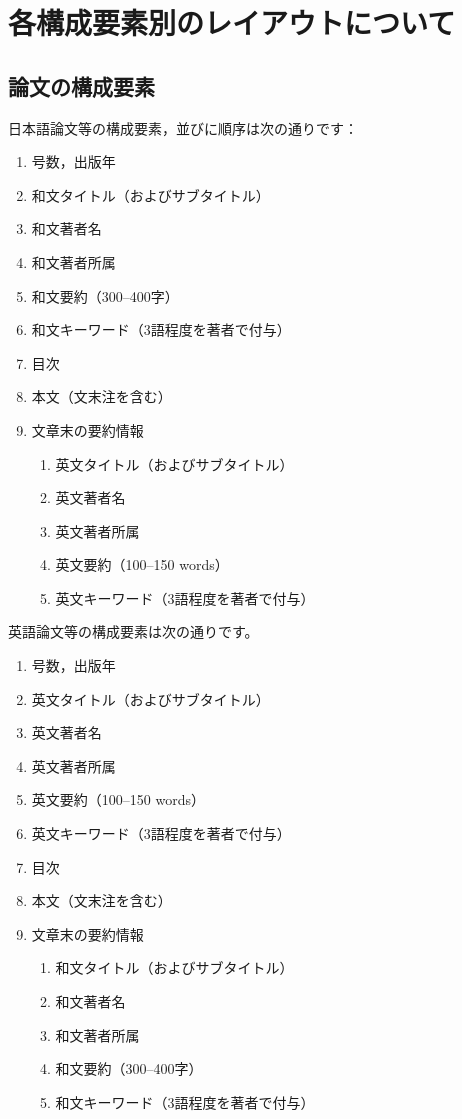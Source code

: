 \documentclass[b5paper,10pt,twocolumn,tombow]{jarticle}
\begin{document}
\section{各構成要素別のレイアウトについて}
\subsection{論文の構成要素}
日本語論文等の構成要素，並びに順序は次の通りです：
\begin{enumerate}
  \item 号数，出版年
  \item 和文タイトル（およびサブタイトル）
  \item 和文著者名
  \item 和文著者所属
  \item 和文要約（300--400字）
  \item 和文キーワード（3語程度を著者で付与）
  \item 目次
  \item 本文（文末注を含む）
  \item 文章末の要約情報
  \begin{enumerate}
    \item 英文タイトル（およびサブタイトル）
    \item 英文著者名
    \item 英文著者所属
    \item 英文要約（100--150 words）
    \item 英文キーワード（3語程度を著者で付与）
  \end{enumerate}
\end{enumerate}
英語論文等の構成要素は次の通りです。
\begin{enumerate}
  \item 号数，出版年
  \item 英文タイトル（およびサブタイトル）
  \item 英文著者名
  \item 英文著者所属
  \item 英文要約（100--150 words）
  \item 英文キーワード（3語程度を著者で付与）
  \item 目次
  \item 本文（文末注を含む）
  \item 文章末の要約情報
  \begin{enumerate}
    \item 和文タイトル（およびサブタイトル）
    \item 和文著者名
    \item 和文著者所属
    \item 和文要約（300--400字）
    \item 和文キーワード（3語程度を著者で付与）
  \end{enumerate}
\end{enumerate}
\end{document}
